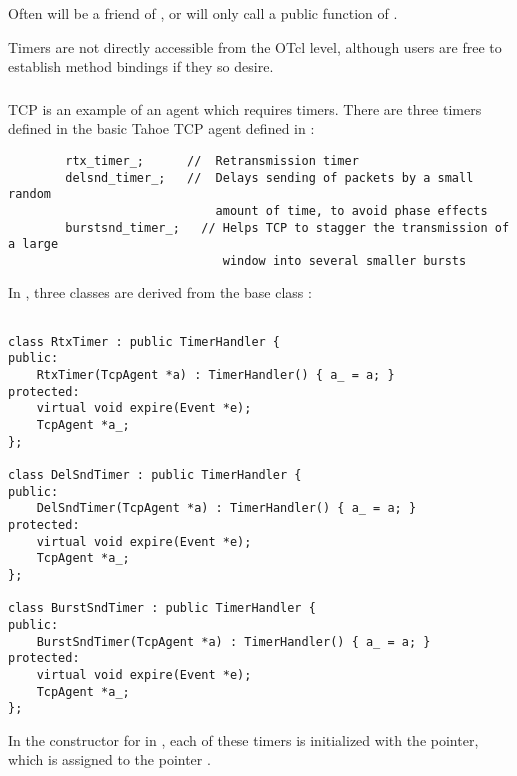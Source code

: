 Often  will be a friend of , or 
 will only call a public function of .

Timers are not directly accessible from the OTcl level, although users are
free to establish method bindings if they so desire.

\subsubsection{}

TCP is an example of an agent which requires timers.  There are three timers
defined in the basic Tahoe TCP agent defined in :

\begin{small}
\begin{verbatim}
        rtx_timer_;      //  Retransmission timer
        delsnd_timer_;   //  Delays sending of packets by a small random
                             amount of time, to avoid phase effects
        burstsnd_timer_;   // Helps TCP to stagger the transmission of a large
                              window into several smaller bursts
\end{verbatim}
\end{small}

In , three classes are derived from the base class 
:
\begin{small}
\begin{verbatim}

class RtxTimer : public TimerHandler {
public:
    RtxTimer(TcpAgent *a) : TimerHandler() { a_ = a; }
protected:                   
    virtual void expire(Event *e);
    TcpAgent *a_;
};  
    
class DelSndTimer : public TimerHandler {
public:
    DelSndTimer(TcpAgent *a) : TimerHandler() { a_ = a; }
protected:
    virtual void expire(Event *e);
    TcpAgent *a_;
};      
    
class BurstSndTimer : public TimerHandler {
public: 
    BurstSndTimer(TcpAgent *a) : TimerHandler() { a_ = a; }
protected:
    virtual void expire(Event *e); 
    TcpAgent *a_;
};  

\end{verbatim}
\end{small}

In the constructor for  in , each of these timers
is initialized with the  pointer, which is assigned to the pointer
.


